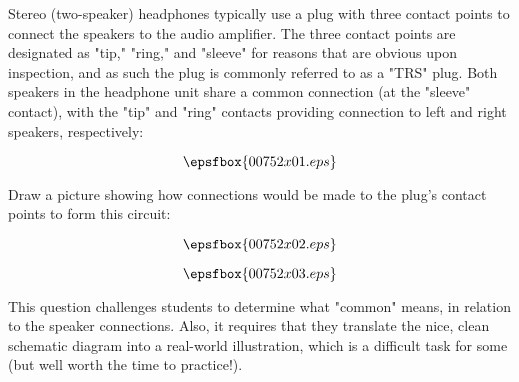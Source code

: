 

Stereo (two-speaker) headphones typically use a plug with three contact points to connect the speakers to the audio amplifier.  The three contact points are designated as "tip," "ring," and "sleeve" for reasons that are obvious upon inspection, and as such the plug is commonly referred to as a "TRS" plug.  Both speakers in the headphone unit share a common connection (at the "sleeve" contact), with the "tip" and "ring" contacts providing connection to left and right speakers, respectively:

$$\epsfbox{00752x01.eps}$$

Draw a picture showing how connections would be made to the plug's contact points to form this circuit:

$$\epsfbox{00752x02.eps}$$







$$\epsfbox{00752x03.eps}$$







This question challenges students to determine what "common" means, in relation to the speaker connections.  Also, it requires that they translate the nice, clean schematic diagram into a real-world illustration, which is a difficult task for some (but well worth the time to practice!).




